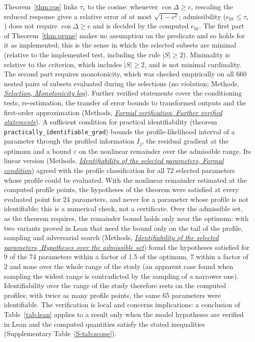 \documentclass[pdflatex,sn-nature]{sn-jnl}
\theoremstyle{plain}
\newcommand{\mref}[2]{\hyperref[#1]{#2}}
\begin{document}
Theorem~\ref{thm:cos} links $\tau_e$ to the cosine: whenever $\cos\Delta\ge c$, rescaling the reduced response gives a relative error of at most $\sqrt{1-c^2}$; admissibility ($e_{\mathrm{fit}}\le\tau_e$) does not require $\cos\Delta\ge c$ and is decided by the computed $e_{\mathrm{fit}}$. The first part of Theorem~\ref{thm:prune} makes no assumption on the predicate and so holds for it as implemented; this is the sense in which the selected subsets are minimal (relative to the implemented test, including the rule $|S|\ge2$). Minimality is relative to the criterion, which includes $|S|\ge2$, and is not minimal cardinality. The second part requires monotonicity, which was checked empirically on all 660 nested pairs of subsets evaluated during the selections (no violation; Methods, \mref{met:monotonicity}{\emph{Selection}, \emph{Monotonicity log}}). Further verified statements cover the conditioning tests, re-estimation, the transfer of error bounds to transformed outputs and the first-order approximation (Methods, \mref{met:formal-further}{\emph{Formal verification}, \emph{Further verified statements}}). A sufficient condition for practical identifiability (theorem \texttt{practically\_identifiable\_grad}) bounds the profile-likelihood interval of a parameter through the profiled information $I_j$, the residual gradient at the optimum and a bound $\varepsilon$ on the nonlinear remainder over the admissible range. Its linear version (Methods, \mref{met:identif-theorem}{\emph{Identifiability of the selected parameters}, \emph{Formal condition}}) agreed with the profile classification for all 72 selected parameters whose profile could be evaluated. With the nonlinear remainder estimated at the computed profile points, the hypotheses of the theorem were satisfied at every evaluated point for 24 parameters, and never for a parameter whose profile is not identifiable; this is a numerical check, not a certificate. Over the admissible set, as the theorem requires, the remainder bound holds only near the optimum: with two variants proved in Lean that need the bound only on the tail of the profile, sampling and adversarial search (Methods, \mref{met:identif-region}{\emph{Identifiability of the selected parameters}, \emph{Hypotheses over the admissible set}}) found the hypotheses satisfied for 9 of the 74 parameters within a factor of 1.5 of the optimum, 7 within a factor of 2 and none over the whole range of the study (an apparent case found when sampling the widest range is contradicted by the sampling of a narrower one). Identifiability over the range of the study therefore rests on the computed profiles; with twice as many profile points, the same 65 parameters were identifiable. The verification is local and concerns implications: a conclusion of Table~\ref{tab:lean} applies to a result only when the model hypotheses are verified in Lean and the computed quantities satisfy the stated inequalities (Supplementary Table~\ref{S-tab:scope}).
\end{document}
